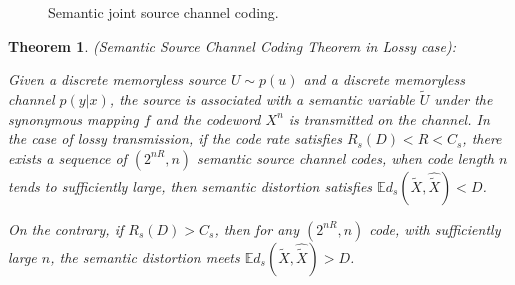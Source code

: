 \documentclass[12pt, draftclsnofoot,onecolumn]{IEEEtran}
\newtheorem{theorem}{\bf{Theorem}}
\begin{document}
\begin{figure}[htbp]
\setlength{\abovecaptionskip}{0.cm}
\setlength{\belowcaptionskip}{-0.cm}
  \caption{Semantic joint source channel coding.}\label{Semantic_JSCC}
\end{figure}

\begin{theorem}\label{Sem_SCCT_Lossy}
(Semantic Source Channel Coding Theorem in Lossy case):

Given a discrete memoryless source $U\sim p(u)$ and a discrete memoryless channel $p(y|x)$, the source is associated with a semantic variable $\tilde{U}$ under the synonymous mapping $f$ and the codeword $X^n$ is transmitted on the channel. In the case of lossy transmission, if the code rate satisfies $R_s(D)<R<C_s$, there exists a sequence of $\left(2^{nR},n\right)$ semantic source channel codes, when code length $n$ tends to sufficiently large, then semantic distortion satisfies $\mathbb{E}d_s(\tilde{X},\hat{\tilde{X}})<D$.

On the contrary, if $R_s(D)>C_s$, then for any $\left(2^{nR},n\right)$ code, with sufficiently large $n$, the semantic distortion meets $\mathbb{E}d_s(\tilde{X},\hat{\tilde{X}})>D$.
\end{theorem}
\end{document}
